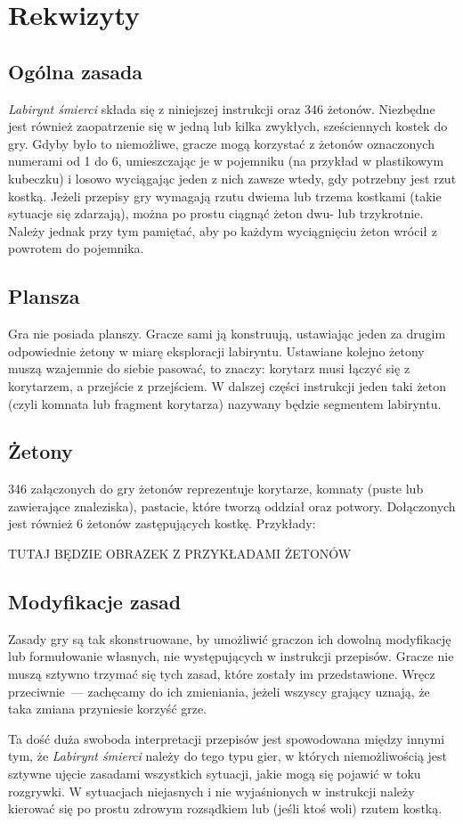 \section{Rekwizyty}
\subsection{Ogólna zasada}
\textit{Labirynt śmierci} składa się z niniejszej instrukcji oraz 346 żetonów.
Niezbędne jest również zaopatrzenie się w jedną lub kilka zwykłych, sześciennych kostek do gry.
Gdyby było to niemożliwe, gracze mogą korzystać z żetonów oznaczonych numerami od 1 do 6, umieszczając je w pojemniku (na przykład w plastikowym kubeczku) i losowo wyciągając jeden z nich zawsze wtedy, gdy potrzebny jest rzut kostką.
Jeżeli przepisy gry wymagają rzutu dwiema lub trzema kostkami (takie sytuacje się zdarzają), można po prostu ciągnąć żeton dwu- lub trzykrotnie.
Należy jednak przy tym pamiętać, aby po każdym wyciągnięciu żeton wrócił z powrotem do pojemnika.

\subsection{Plansza}
Gra nie posiada planszy. Gracze sami ją konstruują, ustawiając jeden za drugim odpowiednie żetony w miarę eksploracji labiryntu.
Ustawiane kolejno żetony muszą wzajemnie do siebie pasować, to znaczy: korytarz musi łączyć się z korytarzem, a przejście z przejściem.
W dalszej części instrukcji jeden taki żeton (czyli komnata lub fragment korytarza) nazywany będzie segmentem labiryntu.

\subsection{Żetony}
346 załączonych do gry żetonów reprezentuje korytarze, komnaty (puste lub zawierające znaleziska), pastacie, które tworzą oddział oraz potwory.
Dołączonych jest również 6 żetonów zastępujących kostkę. Przykłady:

TUTAJ BĘDZIE OBRAZEK Z PRZYKŁADAMI ŻETONÓW

\subsection{Modyfikacje zasad}
Zasady gry są tak skonstruowane, by umożliwić graczon ich dowolną modyfikację lub formułowanie własnych, nie występujących w instrukcji przepisów.
Gracze nie muszą sztywno trzymać się tych zasad, które zostały im przedstawione.
Wręcz przeciwnie~--- zachęcamy do ich zmieniania, jeżeli wszyscy grający uznają, że taka zmiana przyniesie korzyść grze.

Ta dość duża swoboda interpretacji przepisów jest spowodowana między innymi tym, że \textit{Labirynt śmierci} należy do tego typu gier, w których niemożliwością jest sztywne ujęcie zasadami wszystkich sytuacji, jakie mogą się pojawić w toku rozgrywki. W sytuacjach niejasnych i nie wyjaśnionych w instrukcji należy kierować się po prostu zdrowym rozsądkiem lub (jeśli ktoś woli) rzutem kostką.

